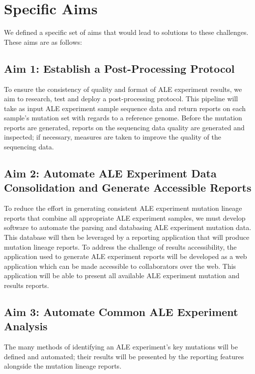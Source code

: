 \documentclass[12pt,final,masters,chapterheads]{ucsd}  %
\begin{document}
\section{Specific Aims}

We defined a specific set of aims that would lead to solutions to these challenges. These aims are as follows:
\subsection{Aim 1: Establish a Post-Processing Protocol}
To ensure the consistency of quality and format of ALE experiment results, we aim to research, test and deploy a post-processing protocol. This pipeline will take as input ALE experiment sample sequence data and return reports on each sample's mutation set with regards to a reference genome. Before the mutation reports are generated, reports on the sequencing data quality are generated and inspected; if necessary, measures are taken to improve the quality of the sequencing data.
\subsection{Aim 2: Automate ALE Experiment Data Consolidation and Generate Accessible Reports}
To reduce the effort in generating consistent ALE experiment mutation lineage reports that combine all appropriate ALE experiment samples, we must develop software to automate the parsing and databasing ALE experiment mutation data. This database will then be leveraged by a reporting application that will produce mutation lineage reports. To address the challenge of results accessibility, the application used to generate ALE experiment reports will be developed as a web application which can be made accessible to collaborators over the web. This application will be able to present all available ALE experiment mutation and results reports.
\subsection{Aim 3: Automate Common ALE Experiment Analysis}
%
%
The many methods of identifying an ALE experiment's key mutations will be defined and automated; their results will be presented by the reporting features alongside the mutation lineage reports.
\end{document}

